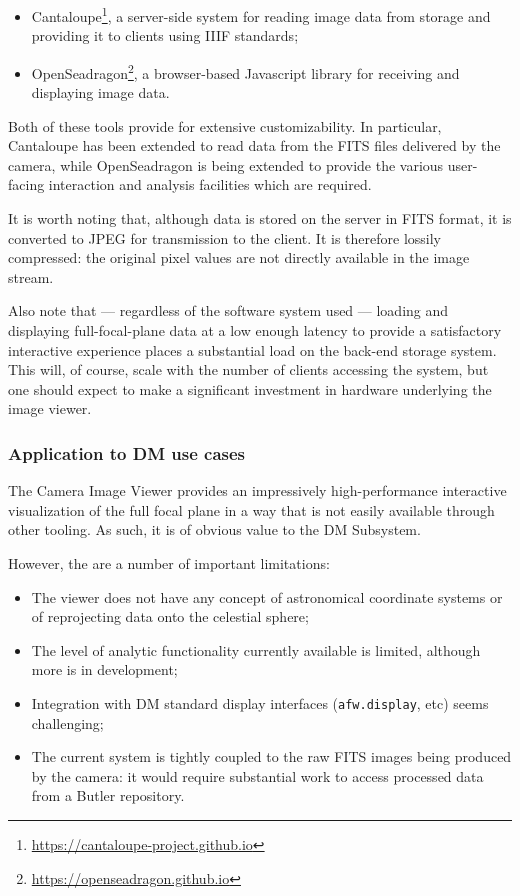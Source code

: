 \begin{itemize}

  \item{Cantaloupe\footnote{\url{https://cantaloupe-project.github.io}}, a server-side system for reading image data from storage and providing it to clients using IIIF standards;}
  \item{OpenSeadragon\footnote{\url{https://openseadragon.github.io}}, a browser-based Javascript library for receiving and displaying image data.}

\end{itemize}

Both of these tools provide for extensive customizability.
In particular, Cantaloupe has been extended to read data from the FITS files delivered by the camera, while OpenSeadragon is being extended to provide the various user-facing interaction and analysis facilities which are required.

It is worth noting that, although data is stored on the server in FITS format, it is converted to JPEG for transmission to the client.
It is therefore lossily compressed: the original pixel values are not directly available in the image stream.

Also note that --- regardless of the software system used --- loading and displaying full-focal-plane data at a low enough latency to provide a satisfactory interactive experience places a substantial load on the back-end storage system.
This will, of course, scale with the number of clients accessing the system, but one should expect to make a significant investment in hardware underlying the image viewer.

\subsubsection{Application to DM use cases}

The Camera Image Viewer provides an impressively high-performance interactive visualization of the full focal plane in a way that is not easily available through other tooling.
As such, it is of obvious value to the DM Subsystem.

However, the are a number of important limitations:

\begin{itemize}

  \item{The viewer does not have any concept of astronomical coordinate systems or of reprojecting data onto the celestial sphere;}
  \item{The level of analytic functionality currently available is limited, although more is in development;}
  \item{Integration with DM standard display interfaces (\texttt{afw.display}, etc) seems challenging;}
  \item{The current system is tightly coupled to the raw FITS images being produced by the camera: it would require substantial work to access processed data from a Butler repository.}

\end{itemize}

